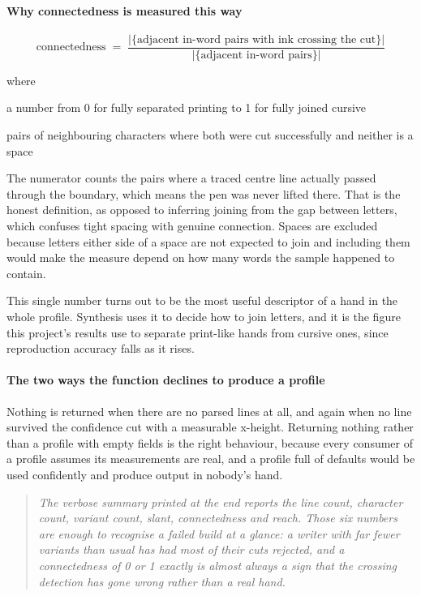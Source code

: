 \paragraph{Why connectedness is measured this way}

\begin{equation}
\mathrm{connectedness} \;=\; \frac{\big|\{\text{adjacent in-word pairs with ink crossing the cut}\}\big|}{\big|\{\text{adjacent in-word pairs}\}\big|}
\end{equation}

\noindent where
\begin{description}[leftmargin=2.4em,style=nextline,font=\normalfont\ttfamily]\setlength\itemsep{1pt}
  \item[{$\mathrm{connectedness}$}] \normalfont a number from 0 for fully separated printing to 1 for fully joined cursive
  \item[{$\text{adjacent in-word pairs}$}] \normalfont pairs of neighbouring characters where both were cut successfully and neither is a space
\end{description}
The numerator counts the pairs where a traced centre line actually passed through the boundary, which means the pen was never lifted there. That is the honest definition, as opposed to inferring joining from the gap between letters, which confuses tight spacing with genuine connection. Spaces are excluded because letters either side of a space are not expected to join and including them would make the measure depend on how many words the sample happened to contain.

This single number turns out to be the most useful descriptor of a hand in the whole profile. Synthesis uses it to decide how to join letters, and it is the figure this project's results use to separate print-like hands from cursive ones, since reproduction accuracy falls as it rises.


\paragraph{The two ways the function declines to produce a profile}
Nothing is returned when there are no parsed lines at all, and again when no line survived the confidence cut with a measurable x-height. Returning nothing rather than a profile with empty fields is the right behaviour, because every consumer of a profile assumes its measurements are real, and a profile full of defaults would be used confidently and produce output in nobody's hand.


\begin{quote}\small\itshape The verbose summary printed at the end reports the line count, character count, variant count, slant, connectedness and reach. Those six numbers are enough to recognise a failed build at a glance: a writer with far fewer variants than usual has had most of their cuts rejected, and a connectedness of 0 or 1 exactly is almost always a sign that the crossing detection has gone wrong rather than a real hand.\end{quote}
